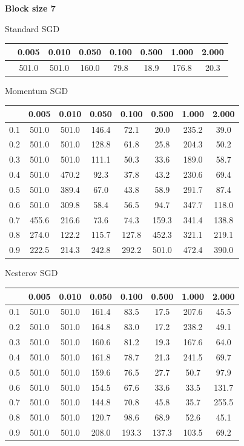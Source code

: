 \documentclass[a4paper,14pt,oneside,openany]{memoir}
\begin{document}
	\textbf{Block size 7} 
	
	Standard SGD 
	
	\begin{tabular}{|c|c|c|c|c|c|c|c|}
	\hline 
	 &0.005 &0.010 &0.050 &0.100 &0.500 &1.000 &2.000 \\
	 \hline 
	 &501.0 &501.0 &160.0 &79.8 &18.9 &176.8 &20.3 \\
	 \hline 
	
	\end{tabular}
	
	Momentum SGD 
	
	\begin{tabular}{|c|c|c|c|c|c|c|c|}
	\hline 
	 &0.005 &0.010 &0.050 &0.100 &0.500 &1.000 &2.000 \\
	 \hline 
	0.1 &501.0 &501.0 &146.4 &72.1 &20.0 &235.2 &39.0 \\
	 \hline 
	0.2 &501.0 &501.0 &128.8 &61.8 &25.8 &204.3 &50.2 \\
	 \hline 
	0.3 &501.0 &501.0 &111.1 &50.3 &33.6 &189.0 &58.7 \\
	 \hline 
	0.4 &501.0 &470.2 &92.3 &37.8 &43.2 &230.6 &69.4 \\
	 \hline 
	0.5 &501.0 &389.4 &67.0 &43.8 &58.9 &291.7 &87.4 \\
	 \hline 
	0.6 &501.0 &309.8 &58.4 &56.5 &94.7 &347.7 &118.0 \\
	 \hline 
	0.7 &455.6 &216.6 &73.6 &74.3 &159.3 &341.4 &138.8 \\
	 \hline 
	0.8 &274.0 &122.2 &115.7 &127.8 &452.3 &321.1 &219.1 \\
	 \hline 
	0.9 &222.5 &214.3 &242.8 &292.2 &501.0 &472.4 &390.0 \\
	 \hline 
	
	\end{tabular}
	
	Nesterov SGD 
	
	\begin{tabular}{|c|c|c|c|c|c|c|c|}
	\hline 
	 &0.005 &0.010 &0.050 &0.100 &0.500 &1.000 &2.000 \\
	 \hline 
	0.1 &501.0 &501.0 &161.4 &83.5 &17.5 &207.6 &45.5 \\
	 \hline 
	0.2 &501.0 &501.0 &164.8 &83.0 &17.2 &238.2 &49.1 \\
	 \hline 
	0.3 &501.0 &501.0 &160.6 &81.2 &19.3 &167.6 &64.0 \\
	 \hline 
	0.4 &501.0 &501.0 &161.8 &78.7 &21.3 &241.5 &69.7 \\
	 \hline 
	0.5 &501.0 &501.0 &159.6 &76.5 &27.7 &50.7 &97.9 \\
	 \hline 
	0.6 &501.0 &501.0 &154.5 &67.6 &33.6 &33.5 &131.7 \\
	 \hline 
	0.7 &501.0 &501.0 &144.8 &70.8 &45.8 &35.7 &255.5 \\
	 \hline 
	0.8 &501.0 &501.0 &120.7 &98.6 &68.9 &52.6 &45.1 \\
	 \hline 
	0.9 &501.0 &501.0 &208.0 &193.3 &137.3 &103.5 &69.2 \\
	 \hline 
	
	\end{tabular}
	
\end{document}
